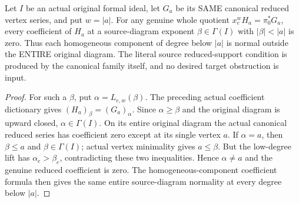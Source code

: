 \begin{theorem}
\label{hir:actual-zero-point-canonical-low-tail-normality}
\leanok
Let $I$ be an actual original formal ideal, let $G_a$ be its SAME
canonical reduced vertex series, and put $w=|a|$. For any genuine
whole quotient $x_e^wH_a=\pi_0^*G_a$, every coefficient of $H_a$
at a source-diagram exponent $\beta\in\Gamma(I)$ with
$|\beta|<|a|$ is zero. Thus each homogeneous component of degree
below $|a|$ is normal outside the ENTIRE original diagram.
The literal source reduced-support condition is produced by the
canonical family itself, and no desired target obstruction is input.
\end{theorem}
\begin{proof}
For such a $\beta$, put $\alpha=L_{e,w}(\beta)$. The preceding
actual coefficient dictionary gives $(H_a)_\beta=(G_a)_\alpha$.
Since $\alpha\ge\beta$ and the original diagram is upward closed,
$\alpha\in\Gamma(I)$. On its entire original diagram the actual
canonical reduced series has coefficient zero except at its single
vertex $a$. If $\alpha=a$, then $\beta\le a$ and
$\beta\in\Gamma(I)$; actual vertex minimality gives $a\le\beta$.
But the low-degree lift has $\alpha_e>\beta_e$, contradicting these
two inequalities. Hence $\alpha\ne a$ and the genuine reduced
coefficient is zero. The homogeneous-component coefficient formula
then gives the same entire source-diagram normality at every degree
below $|a|$.
\end{proof}


